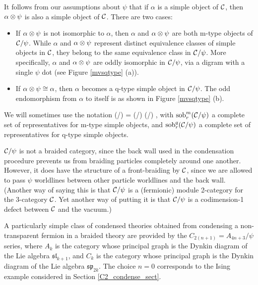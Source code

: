 It follows from our assumptions about $\psi$ that if $\alpha$ is a simple object of $\mathcal{C}$, then
$\alpha\otimes\psi$ is also a simple object of $\mathcal{C}$.
There are two cases:
\begin{itemize}
	\item If $\alpha\otimes\psi$ is not isomorphic to $\alpha$, then $\alpha$ and $\alpha\otimes\psi$ are both m-type
	objects of $\mathcal{C}/\psi$.
	While $\alpha$ and $\alpha\otimes\psi$ represent distinct equivalence classes of simple objects in $\mathcal{C}$,
	they belong to the same equivalence class in $\mathcal{C}/
	\psi$.
	More specifically, $\alpha$ and $\alpha\otimes\psi$ are oddly isomorphic in $\mathcal{C}/\psi$, 
	via a digram with a single $\psi$ dot (see Figure \ref{mvsqtype} (a)).
	\item If $\alpha\otimes\psi \cong \alpha$, then $\alpha$ becomes a q-type simple object in $\mathcal{C}/\psi$.
	The odd endomorphism from $\alpha$ to itself is as shown in Figure \ref{mvsqtype} (b).
\end{itemize}

We will sometimes use the notation
\be
	\sob(\mcc/\psi) = \sobm(\mcc/\psi) \du \sobq(\mcc/\psi) ,
\ee
with $\text{sob}_r^m(\mathcal{C}/\psi)$ a complete set of representatives for m-type simple objects, and
$\text{sob}_r^q(\mathcal{C}/\psi)$ a complete set of representatives for q-type simple objects.

\medskip

$\mathcal{C}/\psi$ is not a braided category, since the back wall used in the condensation procedure 
prevents us from braiding particles completely around one another. 
However, it does have the structure of a front-braiding by $\mathcal{C}$, since we are allowed to 
pass $\psi$ worldlines between other particle worldlines and the back wall. 
(Another way of saying this is that $\mathcal{C}/\psi$ is a (fermionic) module 2-category for the 3-category $\mathcal{C}$.
Yet another way of putting it is that $\mathcal{C}/\psi$ is a codimension-1 defect between $\mathcal{C}$ and the vacuum.)

\medskip


A particularly simple class of condensed theories obtained from condensing a non-
transparent fermion in a braided theory are provided by the $C_{2(n+1)} = A_{4n+3} / \psi$ series, 
where $A_k$ is the category whose principal graph is the Dynkin diagram of the Lie algebra $\mathfrak{sl}_{k+1}$, 
and $C_k$ is the category whose principal graph is the Dynkin 
diagram of the Lie algebra $\mathfrak{sp}_{2k}$.
The choice $n=0$ 
corresponds to the Ising example considered in Section \ref{C2_condense_sect}. 


